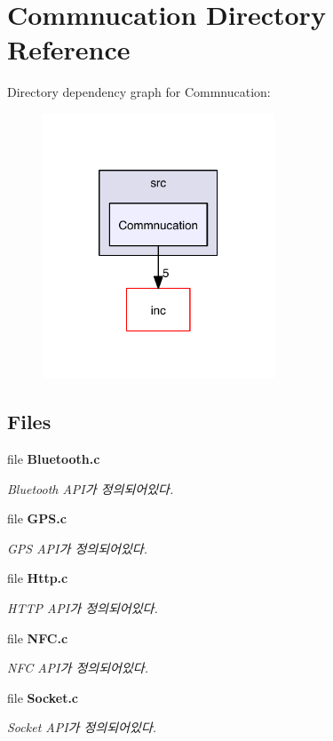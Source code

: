 \section{Commnucation Directory Reference}
\label{dir_7a83bc1081075b8472504e2ca489b0b5}
Directory dependency graph for Commnucation\-:
\nopagebreak
\begin{figure}[H]
\begin{center}
\leavevmode
\includegraphics[width=196pt]{dir_7a83bc1081075b8472504e2ca489b0b5_dep}
\end{center}
\end{figure}
\subsection*{Files}
\begin{DoxyCompactItemize}
\item 
file {\bf Bluetooth.\-c}
\begin{DoxyCompactList}\small\item\em Bluetooth A\-P\-I가 정의되어있다. \end{DoxyCompactList}\item 
file {\bf G\-P\-S.\-c}
\begin{DoxyCompactList}\small\item\em G\-P\-S A\-P\-I가 정의되어있다. \end{DoxyCompactList}\item 
file {\bf Http.\-c}
\begin{DoxyCompactList}\small\item\em H\-T\-T\-P A\-P\-I가 정의되어있다. \end{DoxyCompactList}\item 
file {\bf N\-F\-C.\-c}
\begin{DoxyCompactList}\small\item\em N\-F\-C A\-P\-I가 정의되어있다. \end{DoxyCompactList}\item 
file {\bf Socket.\-c}
\begin{DoxyCompactList}\small\item\em Socket A\-P\-I가 정의되어있다. \end{DoxyCompactList}\end{DoxyCompactItemize}
